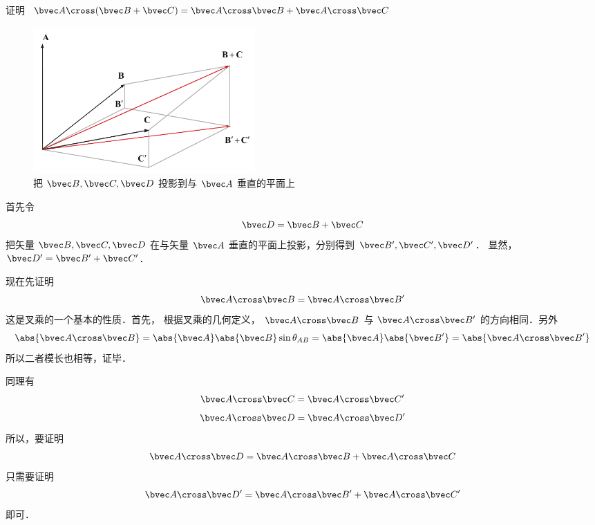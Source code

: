 
证明 $\bvec A \cross (\bvec B + \bvec C) = \bvec A \cross \bvec B + \bvec A \cross \bvec C$ 

\begin{figure}[ht]
\vskip-10pt
\centering
\includegraphics[width=8.5cm]{./figures/CrossP1.pdf}
\caption{把 $\bvec B,\bvec C,\bvec D$ 投影到与 $\bvec A$ 垂直的平面上}
\end{figure}

首先令
\begin{equation}
\bvec D = \bvec B + \bvec C
\end{equation}
把矢量 $\bvec B,\bvec C,\bvec D$ 在与矢量 $\bvec A$ 垂直的平面上投影，分别得到 $\bvec B',\bvec C',\bvec D'$． 显然，$\bvec D'=\bvec B'+\bvec C'$． 

现在先证明
\begin{equation}
\bvec A \cross \bvec B = \bvec A \cross \bvec B'
\end{equation} 
这是叉乘的一个基本的性质．首先，
根据叉乘的几何定义， $\bvec A \cross \bvec B$ 与
 $\bvec A \cross \bvec B'$ 的方向相同．另外
\begin{equation}
\abs{\bvec A \cross \bvec B}  = \abs{\bvec A} \abs{\bvec B} \sin{\theta_{AB}} = \abs{\bvec A} \abs{\bvec B'}=\abs{\bvec A \cross \bvec B'}
\end{equation}
所以二者模长也相等，证毕．

同理有 
\begin{equation}
\bvec A \cross \bvec C = \bvec A \cross \bvec C'
\end{equation}
\begin{equation}
\bvec A \cross \bvec D = \bvec A \cross \bvec D'
\end{equation}
所以，要证明
\begin{equation}
\bvec A \cross \bvec D = \bvec A \cross \bvec B + \bvec A \cross \bvec C
\end{equation}
只需要证明
\begin{equation}
\bvec A \cross \bvec D' = \bvec A \cross \bvec B' + \bvec A \cross \bvec C'
\end{equation}
即可．

